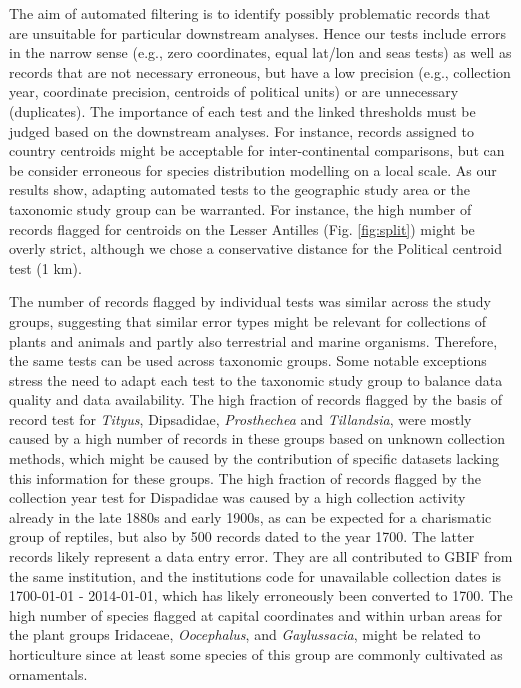 \documentclass[
  12pt,
]{article}
\begin{document}
The aim of automated filtering is to identify possibly problematic records that are unsuitable for particular downstream analyses. Hence our tests include errors in the narrow sense (e.g., zero coordinates, equal lat/lon and seas tests) as well as records that are not necessary erroneous, but have a low precision (e.g., collection year, coordinate precision, centroids of political units) or are unnecessary (duplicates). The importance of each test and the linked thresholds must be judged based on the downstream analyses. For instance, records assigned to country centroids might be acceptable for inter-continental comparisons, but can be consider erroneous for species distribution modelling on a local scale. As our results show, adapting automated tests to the geographic study area or the taxonomic study group can be warranted. For instance, the high number of records flagged for centroids on the Lesser Antilles (Fig. \ref{fig:split}) might be overly strict, although we chose a conservative distance for the Political centroid test (1 km).

The number of records flagged by individual tests was similar across the study groups, suggesting that similar error types might be relevant for collections of plants and animals and partly also terrestrial and marine organisms. Therefore, the same tests can be used across taxonomic groups. Some notable exceptions stress the need to adapt each test to the taxonomic study group to balance data quality and data availability. The high fraction of records flagged by the basis of record test for \emph{Tityus}, Dipsadidae, \emph{Prosthechea} and \emph{Tillandsia}, were mostly caused by a high number of records in these groups based on unknown collection methods, which might be caused by the contribution of specific datasets lacking this information for these groups. The high fraction of records flagged by the collection year test for Dispadidae was caused by a high collection activity already in the late 1880s and early 1900s, as can be expected for a charismatic group of reptiles, but also by 500 records dated to the year 1700. The latter records likely represent a data entry error. They are all contributed to GBIF from the same institution, and the institutions code for unavailable collection dates is 1700-01-01 - 2014-01-01, which has likely erroneously been converted to 1700. The high number of species flagged at capital coordinates and within urban areas for the plant groups Iridaceae, \emph{Oocephalus}, and \emph{Gaylussacia}, might be related to horticulture since at least some species of this group are commonly cultivated as ornamentals.
\end{document}
